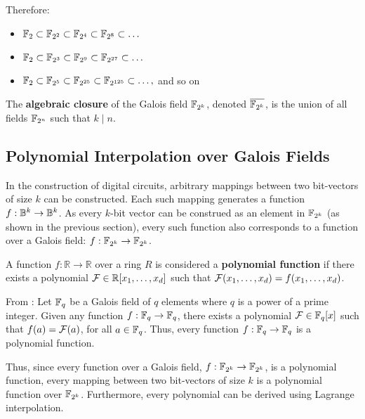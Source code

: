 Therefore:
\begin{itemize}
\item ${\mathbb{F}}_2 \subset {\mathbb{F}}_{2^2} \subset {\mathbb{F}}_{2^4} \subset {\mathbb{F}}_{2^8} \subset \dots$
\item ${\mathbb{F}}_2 \subset {\mathbb{F}}_{2^3} \subset {\mathbb{F}}_{2^9} \subset {\mathbb{F}}_{2^{27}} \subset \dots$
\item ${\mathbb{F}}_2 \subset {\mathbb{F}}_{2^5} \subset {\mathbb{F}}_{2^{25}} \subset {\mathbb{F}}_{2^{125}} \subset \dots,$ and so on
\end{itemize}

\begin{Definition}
The {\bf algebraic closure} of the Galois field ${\mathbb{F}}_{2^k}$, denoted $\overline{{\mathbb{F}}_{2^k}}$, is the 
union of all fields ${\mathbb{F}}_{2^n}$ such that $k \mid n$.
\end{Definition}


\subsection{Polynomial Interpolation over Galois Fields}

In the construction of digital circuits, arbitrary mappings between 
two bit-vectors of size $k$ can be constructed. Each such
mapping generates a function $f: {\mathbb{B}}^k \rightarrow {\mathbb{B}}^k$.
As every $k$-bit vector can be construed as an element in ${\mathbb{F}}_{2^k}$ 
(as shown in the previous section), 
every such function also corresponds to a function over a 
Galois field: $f: {\mathbb{F}}_{2^k} \rightarrow {\mathbb{F}}_{2^k}$. 

\begin{Definition}
A function $f: \mathbb{R} \rightarrow \mathbb{R}$ over a ring $R$ is 
considered a {\bf polynomial function} if there exists a polynomial
${\mathcal{F}} \in \mathbb{R}[x_1,\dots,x_d]$ such that 
${\mathcal{F}}(x_1,\dots,x_d) = f(x_1,\dots,x_d)$.
\end{Definition}

\begin{Theorem}
From \cite{ff:1997}: 
Let ${\mathbb{F}}_{q}$ be a Galois field of $q$ elements where $q$ is a power of a
prime integer. Given any function $f: {\mathbb{F}}_{q} \to {\mathbb{F}}_{q}$, there exists a 
polynomial 
${\mathcal{F}} \in {\mathbb{F}}_{q} [x]$ such that $f(a) = {\mathcal{F}}(a)$, for all $a \in {\mathbb{F}}_{q}$.
Thus, every function $f: {\mathbb{F}}_{q} \to {\mathbb{F}}_{q}$ is a polynomial function.
\end{Theorem}

Thus, since every function over a Galois field, $f: {\mathbb{F}}_{2^k} \rightarrow {\mathbb{F}}_{2^k}$, 
is a polynomial function, 
every mapping between two bit-vectors of size $k$ 
is a polynomial function over ${\mathbb{F}}_{2^k}$.
Furthermore, every polynomial can be derived using Lagrange interpolation.

